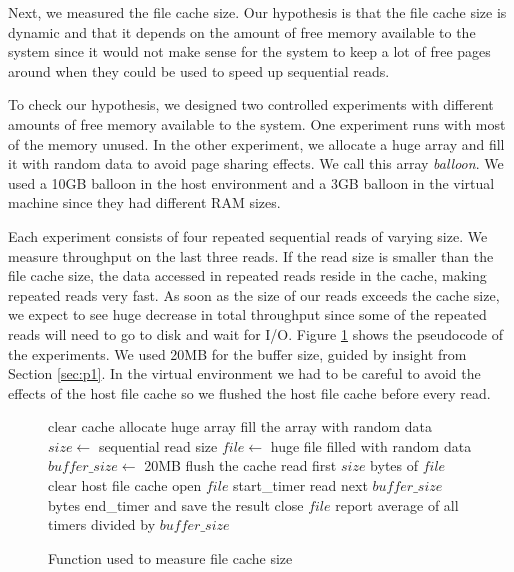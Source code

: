Next, we measured the file cache size. Our hypothesis is that the file cache size is dynamic and that it depends on the amount of free memory available to the system since it would not make sense for the system to keep a lot of free pages around when they could be used to speed up sequential reads.

To check our hypothesis, we designed two controlled experiments with different amounts of free memory available to the system. One experiment runs with most of the memory unused. In the other experiment, we allocate a huge array and fill it with random data to avoid page sharing effects. We call this array \emph{balloon}. We used a 10GB balloon in the host environment and a 3GB balloon in the virtual machine since they had different RAM sizes.

Each experiment consists of four repeated sequential reads of varying size. We measure throughput on the last three reads. If the read size is smaller than the file cache size, the data accessed in repeated reads reside in the cache, making repeated reads very fast. As soon as the size of our reads exceeds the cache size, we expect to see huge decrease in total throughput since some of the repeated reads will need to go to disk and wait for I/O. Figure \ref{fig:p3pseudo} shows the pseudocode of the experiments. We used 20MB for the buffer size, guided by insight from Section \ref{sec:p1}. In the virtual environment we had to be careful to avoid the effects of the host file cache so we flushed the host file cache before every read.

\begin{figure}
\begin{algorithmic}
\STATE clear cache
\STATE allocate huge array
\STATE fill the array with random data
\ENDIF
\STATE $size \leftarrow$ {sequential read size}
\STATE $file \leftarrow$ {huge file filled with random data}
\STATE $buffer\_size \leftarrow$ 20MB
\STATE flush the cache
\STATE read first $size$ bytes of $file$
\STATE clear host file cache
\ENDIF
\STATE open $file$
\STATE start\_timer
\STATE read next $buffer\_size$ bytes
\STATE end\_timer and save the result
\ENDWHILE
\STATE close $file$
\ENDFOR
\STATE report average of all timers divided by $buffer\_size$
\end{algorithmic}
\caption{Function used to measure file cache size}
\label{fig:p3pseudo}
\end{figure}

